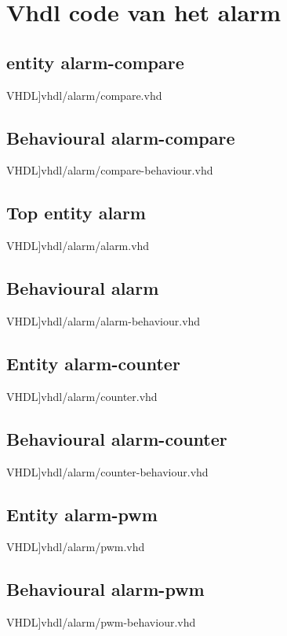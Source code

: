 \chapter[VHDL code]{Vhdl code van het alarm}
\label{Ap:code_alarm}
\section{entity alarm-compare}
\scriptsize 
  VHDL]{vhdl/alarm/compare.vhd}
 \normalsize
\label{code:ent_alarm_compare}
\section{Behavioural alarm-compare}
\scriptsize 
  VHDL]{vhdl/alarm/compare-behaviour.vhd}
 \normalsize
\label{code:beh_alarm_compare}
\section{Top entity alarm}
\scriptsize 
  VHDL]{vhdl/alarm/alarm.vhd}
 \normalsize
\label{code:ent_alarm}
\section{Behavioural alarm}
\scriptsize 
  VHDL]{vhdl/alarm/alarm-behaviour.vhd}
 \normalsize
\label{code:beh_alarm}
\section{Entity alarm-counter}
\scriptsize 
  VHDL]{vhdl/alarm/counter.vhd}
 \normalsize
\label{code:ent_alarm_counter}
\section{Behavioural alarm-counter}
\scriptsize 
  VHDL]{vhdl/alarm/counter-behaviour.vhd}
 \normalsize
\label{code:beh_alarm_counter}
\section{Entity alarm-pwm}
\scriptsize 
  VHDL]{vhdl/alarm/pwm.vhd}
 \normalsize
\label{code:ent_alarm_pwm}
\section{Behavioural alarm-pwm}
\scriptsize 
  VHDL]{vhdl/alarm/pwm-behaviour.vhd}
 \normalsize
\label{code:beh_alarm_pwm}
